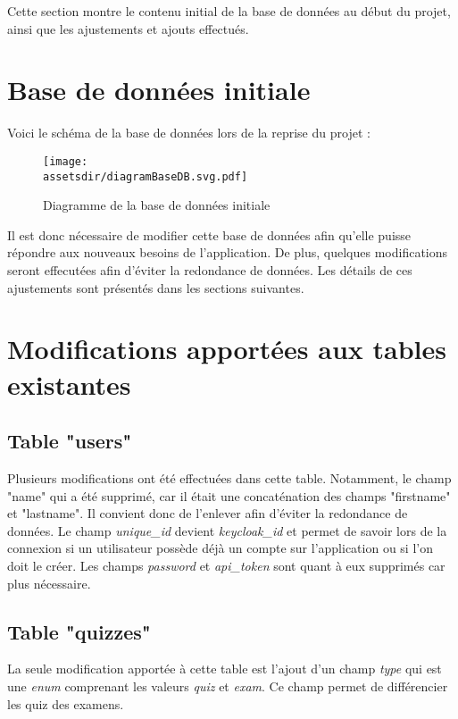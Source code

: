 Cette section montre le contenu initial de la base de données au début du projet, ainsi que les ajustements et ajouts effectués.

\section{Base de données initiale}

Voici le schéma de la base de données lors de la reprise du projet :

\begin{figure}[H]
    \begin{center}
        \texttt{[image: \\assetsdir/diagramBaseDB.svg.pdf]}
    \end{center}
    \caption[Diagramme de la base de données initiale]{\label{assembly}Diagramme de la base de données initiale}
\end{figure}

Il est donc nécessaire de modifier cette base de données afin qu'elle puisse répondre aux nouveaux besoins de l'application. De plus, quelques modifications seront effecutées afin d'éviter la redondance de données. Les détails de ces ajustements sont présentés dans les sections suivantes.

\section{Modifications apportées aux tables existantes}

\subsection{Table "users"}
Plusieurs modifications ont été effectuées dans cette table. Notamment, le champ "name" qui a été supprimé, car il était une concaténation des champs "firstname" et "lastname". Il convient donc de l'enlever afin d'éviter la redondance de données. Le champ \emph{unique\_id} devient \emph{keycloak\_id} et permet de savoir lors de la connexion si un utilisateur possède déjà un compte sur l'application ou si l'on doit le créer. Les champs \emph{password} et \emph{api\_token} sont quant à eux supprimés car plus nécessaire.

\subsection{Table "quizzes"}
La seule modification apportée à cette table est l'ajout d'un champ \emph{type} qui est une \emph{enum} comprenant les valeurs \emph{quiz} et \emph{exam}. Ce champ permet de différencier les quiz des examens.

